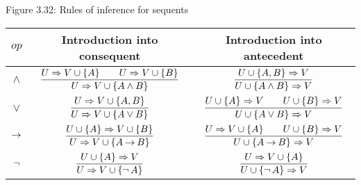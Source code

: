 \documentclass[style=simple,size=12pt]{powerdot}
\begin{document}
\begin{wideslide}[bm=,toc=]{Figure 3.32: Rules of inference for sequents}
\hspace*{-7mm}
\renewcommand{\arraystretch}{2.2}
\begin{tabular}{|c|c|c|}
\hline
$\mathit{op}$& \hspace*{0.5cm}Introduction into consequent\hspace*{0.5cm}%
&\hspace*{0.5cm}Introduction into antecedent\hspace*{0.5cm}\\\hline\hline
$\wedge$ &
$\displaystyle\frac{U\mathrel{\Rightarrow} V\cup \{A\} \hspace{2em}U\mathrel{\Rightarrow} V\cup \{B\}}
{U\mathrel{\Rightarrow} V \cup \{A\wedge B\}}$ &
$\displaystyle\frac{U \cup \{A,B\}\sqnt V}%
{U \cup \{A\wedge B\}\sqnt V}$ \\\hline

$\vee$&
$\displaystyle\frac{U\mathrel{\Rightarrow} V\cup \{A,B\}}{U\mathrel{\Rightarrow} V \cup \{A\vee B\}}$ &
$\displaystyle\frac{U\cup \{A\}\mathrel{\Rightarrow} V \hspace{2em}U\cup \{B\}\mathrel{\Rightarrow} V}
{U\cup \{A\vee B\}\mathrel{\Rightarrow} V}$ \\\hline

$\mathbin{\rightarrow}$&
$\displaystyle\frac{U\cup \{A\}\sqnt V\cup \{B\}}%
{U\sqnt V\cup \{A\imp B\}}$ &
$\displaystyle\frac{U\mathrel{\Rightarrow} V\cup \{A\} \hspace{2em}U\cup \{B\}\mathrel{\Rightarrow} V}
{U\cup \{A\mathbin{\rightarrow} B\}\mathrel{\Rightarrow} V}$ \\\hline

$\mathop{\neg}$&
$\displaystyle\frac{U\cup \{A\}\mathrel{\Rightarrow} V}{U\mathrel{\Rightarrow} V\cup \{\mathop{\neg} A\}}$ &
$\displaystyle\frac{U\mathrel{\Rightarrow} V\cup \{A\}}{U\cup \{\mathop{\neg} A\}\mathrel{\Rightarrow} V}$ \\\hline
\end{tabular}
\renewcommand{\arraystretch}{1}
\end{wideslide}
\end{document}
